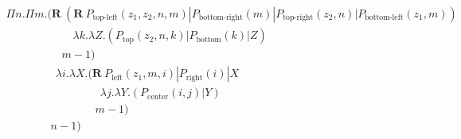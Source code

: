 \documentclass{LMCS}
\newcommand{\X}{\ensuremath{X}}
\newcommand{\Y}{\ensuremath{Y}}
\newcommand{\ii}{\ensuremath{i}}
\newcommand{\jj}{\ensuremath{j}}
\newcommand{\kk}{\ensuremath{k}}
\newcommand{\nn}{\ensuremath{n}}
\newcommand{\mm}{\ensuremath{m}}
\newcommand{\PP}{\ensuremath{P}}
\begin{document}
{\small
\[
\begin{array}{l}
\Pi \nn.\Pi \mm.(\mathbf{R} ~(\mathbf{R}~ 
\PP_{\text{top-left}}(z_1,z_2,\nn, \mm) | \PP_{\text{bottom-right}}(\mm)  | \PP_{\text{top-right}}(z_2,\nn)  | \PP_{\text{bottom-left}}(z_1,\mm))\\
\qquad\qquad\qquad \lambda \kk.\lambda Z.(\PP_{\text{top}}(z_2,\nn, \kk) | \PP_{\text{bottom}}(\kk) | Z)\\
\qquad\qquad\quad m-1)\\
\qquad\qquad~~\lambda \ii.\lambda \X. (\mathbf{R}~ \PP_{\text{left}}(z_1,\mm, \ii) | \PP_{\text{right}}(\ii) | \X \\[1mm]
\qquad\qquad\qquad\qquad~~  \lambda \jj.\lambda \Y.(\PP_{\text{center}}(\ii, \jj) | \Y)\\
\qquad\qquad\qquad\qquad \mm-1)\\
\qquad\qquad \nn-1)\\
\end{array}
\]
}
\end{document}

